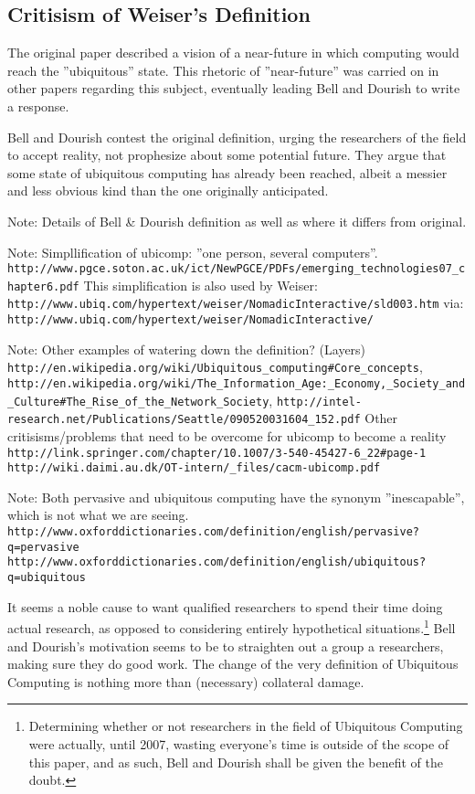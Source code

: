 \subsection*{Critisism of Weiser's Definition}

The original paper described a vision of a near-future in which computing would reach the ''ubiquitous'' state.
This rhetoric of ''near-future'' was carried on in other papers regarding this subject, eventually leading Bell
and Dourish to write a response.

Bell and Dourish contest the original definition, urging the researchers of the field to accept reality, not
prophesize about some potential future. They argue that some state of ubiquitous computing has already been
reached, albeit a messier and less obvious kind than the one originally anticipated.

Note: Details of Bell \& Dourish definition as well as where it differs from original.\cite{bell07}

Note: Simpllification of ubicomp: ''one person, several computers''.
\verb+http://www.pgce.soton.ac.uk/ict/NewPGCE/PDFs/emerging_technologies07_chapter6.pdf+
This simplification is also used by Weiser: \verb+http://www.ubiq.com/hypertext/weiser/NomadicInteractive/sld003.htm+
via: \verb+http://www.ubiq.com/hypertext/weiser/NomadicInteractive/+

Note:
Other examples of watering down the definition? (Layers)
\verb+http://en.wikipedia.org/wiki/Ubiquitous_computing#Core_concepts+,
\verb+http://en.wikipedia.org/wiki/The_Information_Age:_Economy,_Society_and_Culture#The_Rise_of_the_Network_Society+,
\verb+http://intel-research.net/Publications/Seattle/090520031604_152.pdf+
Other critisisms/problems that need to be overcome for ubicomp to become a reality
\verb+http://link.springer.com/chapter/10.1007/3-540-45427-6_22#page-1+
\verb+http://wiki.daimi.au.dk/OT-intern/_files/cacm-ubicomp.pdf+

Note: Both pervasive and ubiquitous computing have the synonym ''inescapable'', which is not what we are seeing.
\verb+http://www.oxforddictionaries.com/definition/english/pervasive?q=pervasive+
\verb+http://www.oxforddictionaries.com/definition/english/ubiquitous?q=ubiquitous+

It seems a noble cause to want qualified researchers to spend their time doing actual research, as opposed to
considering entirely hypothetical situations.\footnote{Determining whether or not researchers in the field of
Ubiquitous Computing were actually, until 2007, wasting everyone's time is outside of the scope of this paper,
and as such, Bell and Dourish shall be given the benefit of the doubt.} Bell and Dourish's motivation seems to
be to straighten out a group a researchers, making sure they do good work. The change of the very definition of
Ubiquitous Computing is nothing more than (necessary) collateral damage.

